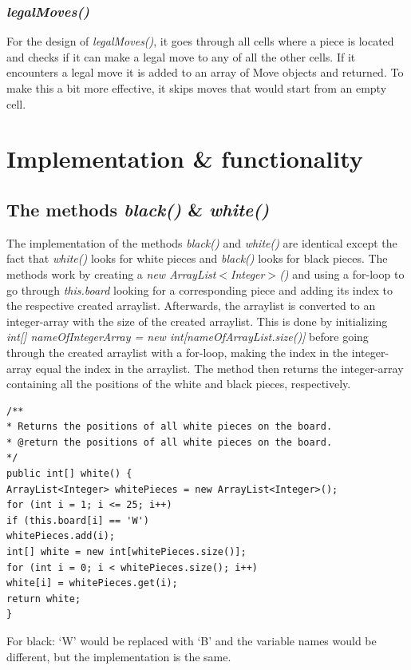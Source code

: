 \documentclass[12pt, a4paper]{article}
\begin{document}
\subsubsection{\emph{legalMoves()}}
For the design of \emph{legalMoves()}, it goes through all cells where a piece is located and checks if it can make a legal move to any of all the other cells. If it encounters a legal move it is added to an array of Move objects and returned. To make this a bit more effective, it skips moves that would start from an empty cell.

\section{Implementation \& functionality}

\subsection{The methods \emph{black()} \& \emph{white()}}
The implementation of the methods \emph{black()} and \emph{white()} are identical except the fact that \emph{white()} looks for white pieces and \emph{black()} looks for black pieces. The methods work by creating a \emph{new ArrayList$<$Integer$>$()} and using a for-loop to go through \emph{this.board} looking for a corresponding piece and adding its index to the respective created arraylist. Afterwards, the arraylist is converted to an integer-array with the size of the created arraylist. This is done by initializing \emph{int[] nameOfIntegerArray = new int[nameOfArrayList.size()]} before going through the created arraylist with a for-loop, making the index in the integer-array equal the index in the arraylist. The method then returns the integer-array containing all the positions of the white and black pieces, respectively.

\begin{lstlisting}[style=JavaStyle]
/**
* Returns the positions of all white pieces on the board.
* @return the positions of all white pieces on the board.
*/
public int[] white() {
ArrayList<Integer> whitePieces = new ArrayList<Integer>();
for (int i = 1; i <= 25; i++)
if (this.board[i] == 'W')
whitePieces.add(i);
int[] white = new int[whitePieces.size()];
for (int i = 0; i < whitePieces.size(); i++)
white[i] = whitePieces.get(i);
return white;
}
\end{lstlisting}

For black: ‘W’ would be replaced with ‘B’ and the variable names would be different, but the implementation is the same.
\end{document}
